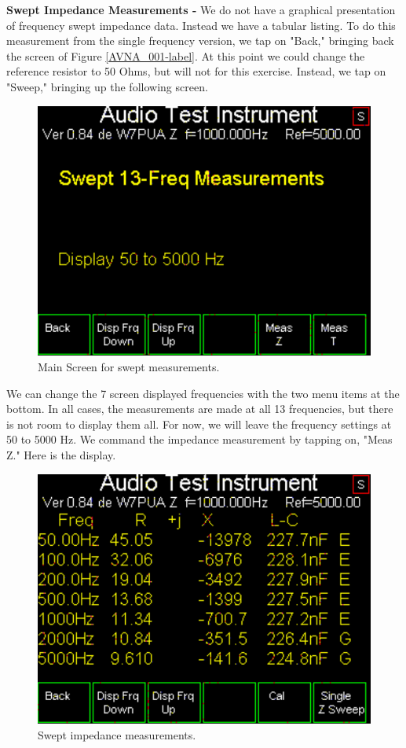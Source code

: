 \textbf{Swept Impedance Measurements - }  We do not have a graphical presentation of frequency swept impedance data.  Instead we have a tabular listing. To do this measurement from the single frequency version, we tap on "Back," bringing back the screen of Figure \ref{AVNA_001-label}. At this point we could change the reference resistor to 50 Ohms, but will not for this exercise. Instead, we tap on "Sweep," bringing up the following screen.
\begin{figure}[H]
\begin{center}
\includegraphics[scale=0.75]{./images/AVNA_007.pdf}
\caption{Main Screen for swept measurements.}
\label{AVNA_007-label}
\end{center}
\end{figure}
We can change the 7 screen displayed frequencies with the two menu items at the bottom.  In all cases, the measurements are made at all 13 frequencies, but there is not room to display them all.  For now, we will leave the frequency settings at 50 to 5000 Hz.  We command the impedance measurement by tapping on, "Meas Z."  Here is the display.
\begin{figure}[H]
\begin{center}
\includegraphics[scale=0.75]{./images/AVNA_009.pdf}
\caption{Swept impedance measurements.}
\label{AVNA_009-label}
\end{center}
\end{figure}
